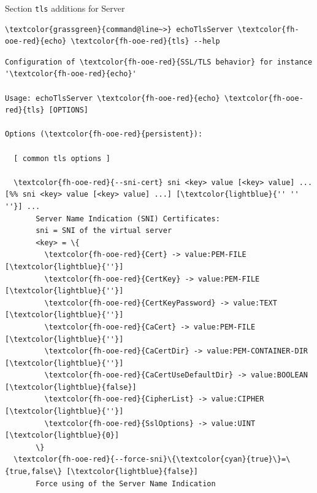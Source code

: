\begin{frame}[fragile]{Section \alert{\lstinline|tls|} additions for Server}
\begin{scriptsize}
\begin{Verbatim}[commandchars=\\\{\}]
\textcolor{grassgreen}{command@line~>} echoTlsServer \textcolor{fh-ooe-red}{echo} \textcolor{fh-ooe-red}{tls} --help
\end{Verbatim}
\begin{Verbatim}[commandchars=\\\{\},frame=leftline,rulecolor=\color{fh-ooe-red}]
Configuration of \textcolor{fh-ooe-red}{SSL/TLS behavior} for instance '\textcolor{fh-ooe-red}{echo}'

Usage: echoTlsServer \textcolor{fh-ooe-red}{echo} \textcolor{fh-ooe-red}{tls} [OPTIONS]

Options (\textcolor{fh-ooe-red}{persistent}):

  [ common tls options ]

  \textcolor{fh-ooe-red}{--sni-cert} sni <key> value [<key> value] ... [%% sni <key> value [<key> value] ...] [\textcolor{lightblue}{'' '' ''}] ...
       Server Name Indication (SNI) Certificates:
       sni = SNI of the virtual server
       <key> = \{
         \textcolor{fh-ooe-red}{Cert} -> value:PEM-FILE                  [\textcolor{lightblue}{''}]
         \textcolor{fh-ooe-red}{CertKey} -> value:PEM-FILE               [\textcolor{lightblue}{''}]
         \textcolor{fh-ooe-red}{CertKeyPassword} -> value:TEXT           [\textcolor{lightblue}{''}]
         \textcolor{fh-ooe-red}{CaCert} -> value:PEM-FILE                [\textcolor{lightblue}{''}]
         \textcolor{fh-ooe-red}{CaCertDir} -> value:PEM-CONTAINER-DIR    [\textcolor{lightblue}{''}]
         \textcolor{fh-ooe-red}{CaCertUseDefaultDir} -> value:BOOLEAN    [\textcolor{lightblue}{false}]
         \textcolor{fh-ooe-red}{CipherList} -> value:CIPHER              [\textcolor{lightblue}{''}]
         \textcolor{fh-ooe-red}{SslOptions} -> value:UINT                [\textcolor{lightblue}{0}]
       \}
  \textcolor{fh-ooe-red}{--force-sni}\{\textcolor{cyan}{true}\}=\{true,false\} [\textcolor{lightblue}{false}]
       Force using of the Server Name Indication
\end{Verbatim}
\end{scriptsize}
\end{frame}
